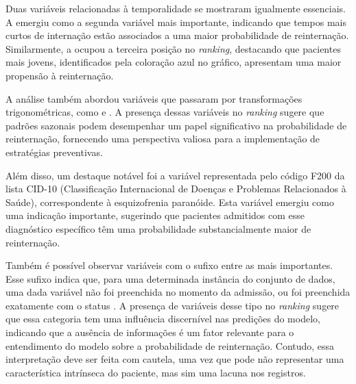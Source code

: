 Duas variáveis relacionadas à temporalidade se mostraram igualmente essenciais. A  emergiu como a segunda variável mais importante, indicando que tempos mais curtos de internação estão associados a uma maior probabilidade de reinternação. Similarmente, a  ocupou a terceira posição no \textit{ranking}, destacando que pacientes mais jovens, identificados pela coloração azul no gráfico, apresentam uma maior propensão à reinternação.

A análise também abordou variáveis que passaram por transformações trigonométricas, como  e . A presença dessas variáveis no \textit{ranking} sugere que padrões sazonais podem desempenhar um papel significativo na probabilidade de reinternação, fornecendo uma perspectiva valiosa para a implementação de estratégias preventivas.

Além disso, um destaque notável foi a variável representada pelo código F200 da lista CID-10 (Classificação Internacional de Doenças e Problemas Relacionados à Saúde), correspondente à esquizofrenia paranóide. Esta variável emergiu como uma indicação importante, sugerindo que pacientes admitidos com esse diagnóstico específico têm uma probabilidade substancialmente maior de reinternação.

Também é possível observar variáveis com o sufixo  entre as mais importantes. Esse sufixo indica que, para uma determinada instância do conjunto de dados, uma dada variável não foi preenchida no momento da admissão, ou foi preenchida exatamente com o status . A presença de variáveis desse tipo no \textit{ranking} sugere que essa categoria tem uma influência discernível nas predições do modelo, indicando que a ausência de informações é um fator relevante para o entendimento do modelo sobre a probabilidade de reinternação. Contudo, essa interpretação deve ser feita com cautela, uma vez que pode não representar uma característica intrínseca do paciente, mas sim uma lacuna nos registros.